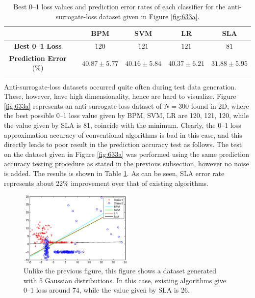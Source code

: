 \begin{table}[htbp!]
\centering
\begin{tabular}{|cc|  ccc|c|}
\hline\hline
 && {\bf BPM} & {\bf SVM} & {\bf LR} & {\bf SLA}\\  
\hline
{\bf Best 0--1 Loss} && 
$120$ & $121$ & $121$ & $81$ \\  
{\bf Prediction Error} (\%) && 
$40.87 \pm 5.77$ & $40.16 \pm 5.84$ & $40.37 \pm 6.21$ & $31.88 \pm 5.95$ \\  
\hline\hline
\end{tabular}
\caption{Best 0--1 loss values and prediction error rates of each classifier for the anti-surrogate-loss dataset given in Figure \ref{fig:633a}.} 
\label{tab:antirates}
\end{table}


Anti-surrogate-loss datasets occurred quite often during test data generation. These, however, have high dimensionality, hence are hard to visualize. Figure \ref{fig:633a} represents an anti-surrogate-loss dataset of $N=300$ found in 2D, where the best possible 0--1 loss value given by BPM, SVM, LR are 120, 121, 120, while the value given by SLA is 81, coincide with the minimum. Clearly, the 0--1 loss approximation accuracy of conventional algorithms is bad in this case, and this directly leads to poor result in the prediction accuracy test as follows. The test on the dataset given in Figure \ref{fig:633a} was performed using the same prediction accuracy testing procedure as stated in the previous subsection, however no noise is added. The results is shown in Table \ref{tab:antirates}. As can be seen, SLA error rate represents about 22\% improvement over that of existing algorithms. 

\begin{figure}[here]
\includegraphics[width=0.50\textwidth]{images/fig63_633b.eps}
\caption{
Unlike the previous figure, this figure shows a dataset generated with 5 Gaussian distributions. In this case, existing algorithms give 0--1 loss around 74, while the value given by SLA is 26. 
}
\label{fig:633b}
\end{figure}

